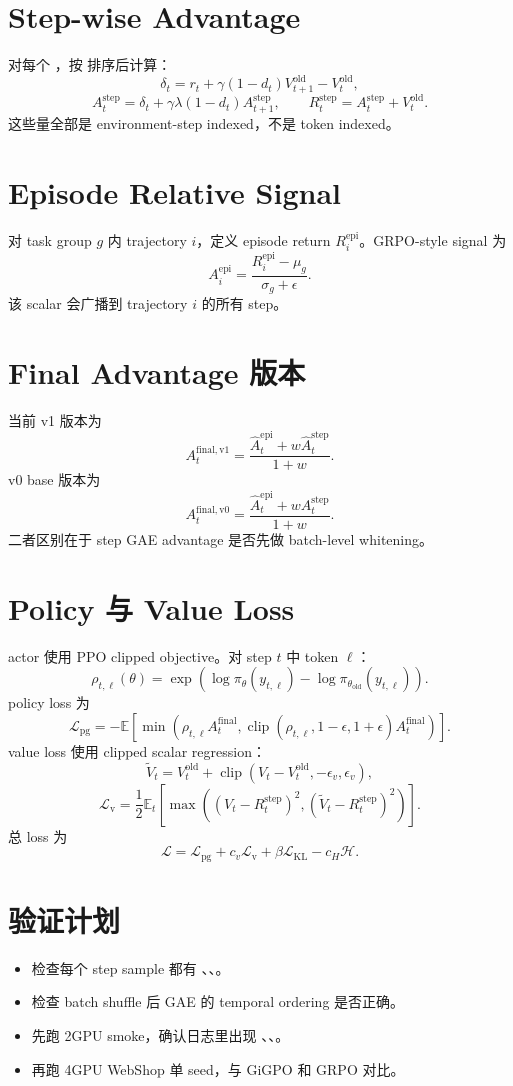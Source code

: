 \documentclass[10pt]{ctexart}
\newcommand{\clip}{\operatorname{clip}}
\begin{document}
\section*{Step-wise Advantage}
对每个 ，按  排序后计算：
\[
\delta_t = r_t + \gamma(1-d_t)V^{\mathrm{old}}_{t+1} - V^{\mathrm{old}}_t,
\]
\[
A_t^{\mathrm{step}} = \delta_t + \gamma\lambda(1-d_t)A_{t+1}^{\mathrm{step}},
\qquad
R_t^{\mathrm{step}} = A_t^{\mathrm{step}} + V^{\mathrm{old}}_t.
\]
这些量全部是 environment-step indexed，不是 token indexed。

\section*{Episode Relative Signal}
对 task group $g$ 内 trajectory $i$，定义 episode return $R_i^{\mathrm{epi}}$。GRPO-style signal 为
\[
A_i^{\mathrm{epi}}
=\frac{R_i^{\mathrm{epi}}-\mu_g}{\sigma_g+\epsilon}.
\]
该 scalar 会广播到 trajectory $i$ 的所有 step。

\section*{Final Advantage 版本}
当前 v1 版本为
\[
A_t^{\mathrm{final,v1}}
=\frac{\widehat A_t^{\mathrm{epi}}+w\widehat A_t^{\mathrm{step}}}{1+w}.
\]
v0 base 版本为
\[
A_t^{\mathrm{final,v0}}
=\frac{\widehat A_t^{\mathrm{epi}}+w A_t^{\mathrm{step}}}{1+w}.
\]
二者区别在于 step GAE advantage 是否先做 batch-level whitening。

\section*{Policy 与 Value Loss}
actor 使用 PPO clipped objective。对 step $t$ 中 token $\ell$：
\[
\rho_{t,\ell}(\theta)
=\exp(\log\pi_\theta(y_{t,\ell})-\log\pi_{\theta_{\mathrm{old}}}(y_{t,\ell})).
\]
policy loss 为
\[
\mathcal{L}_{\mathrm{pg}}
=-\mathbb{E}\left[\min\left(\rho_{t,\ell}A_t^{\mathrm{final}},
\clip(\rho_{t,\ell},1-\epsilon,1+\epsilon)A_t^{\mathrm{final}}\right)\right].
\]
value loss 使用 clipped scalar regression：
\[
\widetilde V_t = V_t^{\mathrm{old}} + \clip(V_t-V_t^{\mathrm{old}},-\epsilon_v,\epsilon_v),
\]
\[
\mathcal{L}_{\mathrm v}
=\frac12\mathbb{E}_t\left[\max\left((V_t-R_t^{\mathrm{step}})^2,
(\widetilde V_t-R_t^{\mathrm{step}})^2\right)\right].
\]
总 loss 为
\[
\mathcal{L}=\mathcal{L}_{\mathrm{pg}}+c_v\mathcal{L}_{\mathrm v}+\beta\mathcal{L}_{\mathrm{KL}}-c_H\mathcal{H}.
\]

\section*{验证计划}
\begin{itemize}
\item 检查每个 step sample 都有 、、。
\item 检查 batch shuffle 后 GAE 的 temporal ordering 是否正确。
\item 先跑 2GPU smoke，确认日志里出现 、、。
\item 再跑 4GPU WebShop 单 seed，与 GiGPO 和 GRPO 对比。
\end{itemize}
\end{document}
